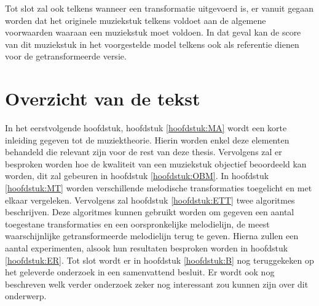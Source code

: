 Tot slot zal ook telkens wanneer een transformatie uitgevoerd is, er vanuit gegaan worden dat het originele muziekstuk telkens voldoet aan de algemene voorwaarden waaraan een muziekstuk moet voldoen. In dat geval kan de score van dit muziekstuk in het voorgestelde model telkens ook als referentie dienen voor de getransformeerde versie. 

\section{Overzicht van de tekst}
In het eerstvolgende hoofdstuk, hoofdstuk \ref{hoofdstuk:MA} wordt een korte inleiding gegeven tot de muziektheorie. Hierin worden enkel deze elementen behandeld die relevant zijn voor de rest van deze thesis. Vervolgens zal er besproken worden hoe de kwaliteit van een muziekstuk objectief beoordeeld kan worden, dit zal gebeuren in hoofdstuk \ref{hoofdstuk:OBM}. In hoofdstuk \ref{hoofdstuk:MT} worden verschillende melodische transformaties toegelicht en met elkaar vergeleken. Vervolgens zal hoofdstuk \ref{hoofdstuk:ETT} twee algoritmes beschrijven. Deze algoritmes kunnen gebruikt worden om gegeven een aantal toegestane transformaties en een oorspronkelijke melodielijn, de meest waarschijnlijke getransformeerde melodielijn terug te geven. Hierna zullen een aantal experimenten, alsook hun resultaten besproken worden in hoofdstuk \ref{hoofdstuk:ER}. Tot slot wordt er in hoofdstuk \ref{hoofdstuk:B} nog teruggekeken op het geleverde onderzoek in een samenvattend besluit. Er wordt ook nog beschreven welk verder onderzoek zeker nog interessant zou kunnen zijn over dit onderwerp. 

